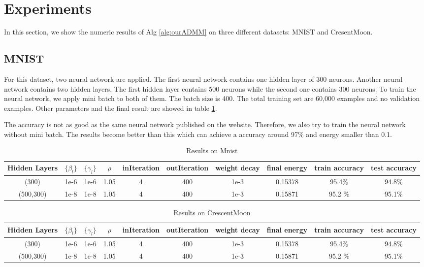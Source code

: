 \documentclass[letterpaper, 10 pt, conference]{ieeeconf}  %
\begin{document}
\section{Experiments} \label{experiment}
In this section, we show the numeric results of Alg \ref{alg:ourADMM} on three different datasets: MNIST and CresentMoon. 

\subsection{MNIST}
For this dataset, two neural network are applied. The first neural network contains one hidden layer of 300 neurons. Another neural network contains two hidden layers. The first hidden layer contains 500 neurons while the second one contains 300 neurons. To train the neural network, we apply mini batch to both of them. The batch size is 400. The total training set are 60,000 examples and no validation examples. Other parameters and the final result are showed in table \ref{tab:parMNIST}.



The accuracy is not as good as the same neural network published on the website. Therefore, we also try to train the neural network without mini batch. The results become better than this which can achieve a accuracy around 97\% and energy smaller than 0.1. 

\begin{table}[h]
\centering
\caption{Results on Mnist}
\begin{tabular}{|c|c|c|c|c|c|c|c|c|c|}
\hline
	Hidden Layers & $\{\beta_l\}$ & $\{\gamma_l\}$ & $\rho$ & inIteration & outIteration & weight decay & final energy & train accuracy & test accuracy\\
\hline
		(300) & 1e-6 & 1e-6 & 1.05 & 4 & 400 & 1e-3 & 0.15378 & 95.4\% & 94.8\% \\
		(500,300) & 1e-8 & 1e-8 & 1.05 & 4 & 400 & 1e-3 & 0.15871 & 95.2 \% & 95.1\% \\ 
\hline
\end{tabular}
\label{tab:parMNIST}
\end{table}

\begin{table}[h]
\centering
\caption{Results on CrescentMoon}
\begin{tabular}{|c|c|c|c|c|c|c|c|c|c|}
\hline
	Hidden Layers & $\{\beta_l\}$ & $\{\gamma_l\}$ & $\rho$ & inIteration & outIteration & weight decay & final energy & train accuracy & test accuracy\\
\hline
		(300) & 1e-6 & 1e-6 & 1.05 & 4 & 400 & 1e-3 & 0.15378 & 95.4\% & 94.8\% \\
		(500,300) & 1e-8 & 1e-8 & 1.05 & 4 & 400 & 1e-3 & 0.15871 & 95.2 \% & 95.1\% \\ 
\hline
\end{tabular}
\label{tab:parMoon}
\end{table}
\end{document}
